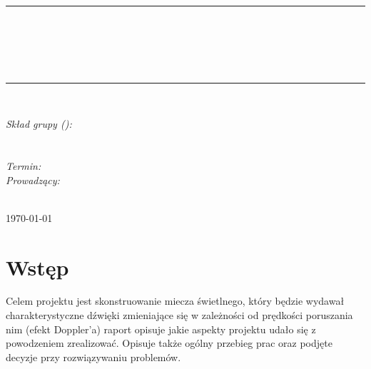 \documentclass[10pt, a4paper]{article}
\begin{document}
\def\tablename{Tabela}	%

\begin{titlepage}
	\begin{center}
		\textsc{\LARGE \formakursu}\\[1cm]		
		\textsc{\Large \kurs}\\[0.5cm]		
		\rule{\textwidth}{0.08cm}\\[0.4cm]
		{\huge \bfseries \doctype}\\[1cm]
		{\huge \bfseries \projectname}\\[0.5cm]
		{\huge \bfseries \acronim}\\[0.4cm]
		\rule{\textwidth}{0.08cm}\\[1cm]
		
		\begin{flushright} \large
		\emph{Skład grupy (\nrgrupy):}\\
		\osobaA\\
		\osobaB\\[0.4cm]
		
		\emph{Termin: }\termin\\[0.4cm]

		\emph{Prowadzący:} \\
		\prowadzacy \\
		
		\end{flushright}
		
		\vfill
		
		{\large \today}
	\end{center}	
\end{titlepage}

\newpage
\tableofcontents
\newpage

\section{Wstęp}
\label{sec:Wstęp}
Celem projektu jest skonstruowanie miecza świetlnego, który będzie wydawał charakterystyczne dźwięki zmieniające się w zależności od prędkości poruszania nim (efekt Doppler'a) raport opisuje jakie aspekty projektu udało się z powodzeniem zrealizować. Opisuje także ogólny przebieg prac oraz podjęte decyzje przy rozwiązywaniu problemów.
\end{document}
